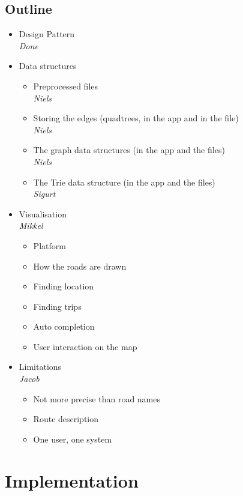 \documentclass[a4paper,11pt]{article}
\begin{document}
\subsection{Outline}
\begin{itemize}
	\item Design Pattern \\
		\textsl{Done}
	\item Data structures
	\begin{itemize}
		\item Preprocessed files \\
		\textsl{Niels}
		\item Storing the edges (quadtrees, in the app and in the file) \\
		\textsl{Niels}
		\item The graph data structures (in the app and the files) \\
		\textsl{Niels}
		\item The Trie data structure (in the app and the files) \\
		\textsl{Sigurt}
	\end{itemize}
	\item Visualisation \\
		\textsl{Mikkel}
	\begin{itemize}
		\item Platform
		\item How the roads are drawn
		\item Finding location
		\item Finding trips
		\item Auto completion
		\item User interaction on the map
	\end{itemize}
	\item Limitations \\
		\textsl{Jacob}
	\begin{itemize}
		\item Not more precise than road names
		\item Route description
		\item One user, one system
	\end{itemize}
\end{itemize}

\pagebreak
\section{Implementation}
\label{sec:Implementation}
\end{document}
